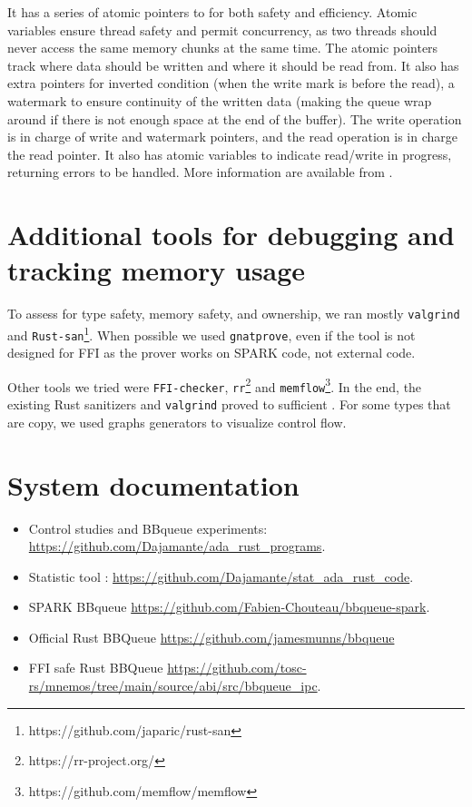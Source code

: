 \documentclass[nomenclature, english, bibtex]{kththesis}
\begin{document}
It has a series of atomic pointers to for both safety and efficiency. Atomic variables ensure thread safety and permit concurrency, as two threads should never access the same memory chunks at the same time. The atomic pointers track where data should be written and where it should be read from. It also has extra pointers for inverted condition (when the write mark is before the read), a watermark to ensure continuity of the written data (making the queue wrap around if there is not enough space at the end of the buffer).  The write operation is in charge of write and watermark pointers, and the read operation is in charge the read pointer. It also has atomic variables to indicate read/write in progress, returning errors to be handled. More information are available from \cite{chouteau_rust_2021, munns_design_2019}.


\section{Additional tools for debugging and tracking memory usage}

To assess for type safety, memory safety, and ownership, we ran mostly \texttt{valgrind} and \texttt{Rust-san}\footnote{https://github.com/japaric/rust-san}.
When possible we used \texttt{gnatprove}, even if the tool is not designed for FFI as the prover works on SPARK code, not external code.

Other tools we tried were \texttt{FFI-checker}\cite{li_detecting_2022}, \texttt{rr}\footnote{https://rr-project.org/} and \texttt{memflow}\footnote{https://github.com/memflow/memflow}. In the end, the existing Rust sanitizers and \texttt{valgrind} proved to sufficient .
For some types that are copy, we used graphs generators to visualize control flow.


\section{System documentation}
\label{sec:systemDocumentation}

\begin{itemize}
    \item Control studies and BBqueue experiments: 
        \url{https://github.com/Dajamante/ada_rust_programs}.
    \item Statistic tool : 
        \url{https://github.com/Dajamante/stat_ada_rust_code}.
    \item SPARK BBqueue 
        \url{https://github.com/Fabien-Chouteau/bbqueue-spark}.
    \item Official Rust BBQueue 
        \url{https://github.com/jamesmunns/bbqueue}
    \item FFI safe Rust BBQueue
        \url{https://github.com/tosc-rs/mnemos/tree/main/source/abi/src/bbqueue_ipc}.
\end{itemize}
\end{document}
